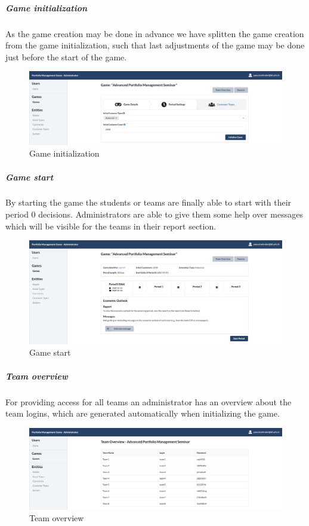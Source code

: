 \subparagraph{Game initialization}
As the game creation may be done in advance we have splitten the game creation from the game initialization, such that last adjustments of the game may be done just before the start of the game.
\begin{figure}[h!]
  \centering
  \includegraphics[scale=0.2]{img/application-overview/administrator/04_game_initialization.png}
  \caption{Game initialization}
\end{figure}

\subparagraph{Game start}
By starting the game the students or teams are finally able to start with their period 0 decisions. Administrators are able to give them some help over messages which will be visible for the teams in their report section.
\begin{figure}[h!]
  \centering
  \includegraphics[scale=0.2]{img/application-overview/administrator/05_game_start.png}
  \caption{Game start}
\end{figure}


\subparagraph{Team overview}
\label{subparagraph:team_overview}
For providing access for all teams an administrator has an overview about the team logins, which are generated automatically when initializing the game.
\begin{figure}[h!]
  \centering
  \includegraphics[scale=0.2]{img/application-overview/administrator/06_team_login_overview.png}
  \caption{Team overview}
\end{figure}

